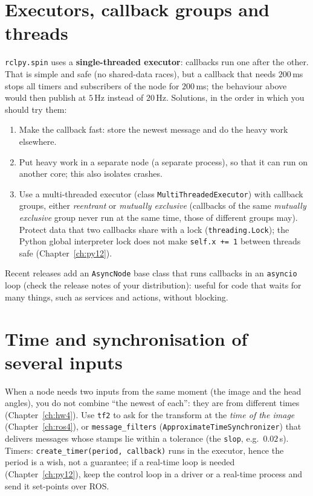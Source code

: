 \section*{Executors, callback groups and threads}
\verb!rclpy.spin! uses a \textbf{single-threaded executor}: callbacks run one after the other. That is simple and safe (no shared-data races), but a callback that needs $200$\,ms stops all timers and subscribers of the node for $200$\,ms; the behaviour above would then publish at $5$\,Hz instead of $20$\,Hz. Solutions, in the order in which you should try them:
\begin{enumerate}[nosep]
\item Make the callback fast: store the newest message and do the heavy work elsewhere.
\item Put heavy work in a separate node (a separate process), so that it can run on another core; this also isolates crashes.
\item Use a multi-threaded executor (class \verb!MultiThreadedExecutor!) with callback groups, either \emph{reentrant} or \emph{mutually exclusive} (callbacks of the same \emph{mutually exclusive} group never run at the same time, those of different groups may). Protect data that two callbacks share with a lock (\verb!threading.Lock!); the Python global interpreter lock does not make \verb!self.x += 1! between threads safe (Chapter~\ref{ch:py12}).
\end{enumerate}
Recent releases add an \verb!AsyncNode! base class that runs callbacks in an \verb!asyncio! loop (check the release notes of your distribution): useful for code that waits for many things, such as services and actions, without blocking.

\section*{Time and synchronisation of several inputs}
When a node needs two inputs from the same moment (the image and the head angles), you do not combine ``the newest of each'': they are from different times (Chapter~\ref{ch:hw4}). Use \verb!tf2! to ask for the transform at the \emph{time of the image} (Chapter~\ref{ch:ros4}), or \verb!message_filters! (\verb!ApproximateTimeSynchronizer!) that delivers messages whose stamps lie within a tolerance (the \verb!slop!, e.g.\ $0.02$\,s). Timers: \verb!create_timer(period, callback)! runs in the executor, hence the period is a wish, not a guarantee; if a real-time loop is needed (Chapter~\ref{ch:py12}), keep the control loop in a driver or a real-time process and send it set-points over ROS.

